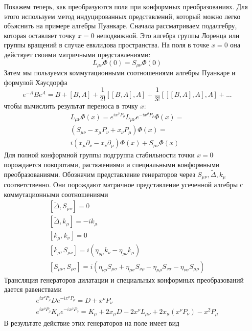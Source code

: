 \documentclass[a4paper,12pt]{article} \usepackage[utf8x]{inputenc} \usepackage[russian]{babel}
\theoremstyle{definition} \newtheorem{corollary}{Corollary}[theorem] \theoremstyle{definition}
\begin{document}
Покажем теперь, как преобразуются поля при конформных преобразованиях. Для этого используем метод
индуцированных представлений, который можно легко объяснить на примере алгебры Пуанкаре. Сначала
рассматриваем подалгебру, которая оставляет точку $x=0$ неподвижной. Это алгебра группы Лоренца или
группы вращений в случае евклидова пространства. На поля в точке $x=0$ она действует своими
матричными представлениями:
\begin{equation}
  \label{eq:176} L_{\mu\nu}\Phi(0)=S_{\mu\nu}\Phi(0)
\end{equation} Затем мы пользуемся коммутационными соотношениями алгебры Пуанкаре и формулой
Хаусдорфа
\begin{equation}
  \label{eq:177} e^{-A}B e^{A}=B+[B,A]+\frac{1}{2!}[[B,A],A]+\frac{1}{3!}[[[B,A],A],A]+\dots
\end{equation} чтобы вычислить результат переноса в точку $x$:
\begin{multline}
  \label{eq:178} L_{\mu\nu}\Phi(x)=e^{ix^{\rho}P_{\rho}}L_{\mu\nu}e^{-i x^{\rho}P_{\rho}}\Phi(x)=\\
(S_{\mu\nu}-x_{\mu}P_{\nu}+x_{\nu}P_{\mu})\Phi(x)=\\
i(x_{\mu}\partial_{\nu}-x_{\nu}\partial_{\mu})\Phi(x)+S_{\mu\nu}\Phi(x)
\end{multline} Для полной конформной группы подгруппа стабильности точки $x=0$ порождается
поворотами, растяжениями и специальными конформными преобразованиями. Обозначим представление
генераторов через $S_{\mu\nu}, \tilde \Delta, k_{\mu}$ соответственно. Они порождают матричное
представление усеченной алгебры с коммутационными соотношениями
\begin{eqnarray}
  \label{eq:179} \left[\tilde\Delta,S_{\mu\nu}\right]=0\\ \left[\tilde \Delta,k_{\mu}\right]=-i
k_{\mu}\\ \left[k_{\mu},k_{\nu}\right]=0\\
\left[k_{\rho},S_{\mu\nu}\right]=i(\eta_{\rho\mu}k_{\nu}-\eta_{\rho\nu}k_{\mu})\\
\left[S_{\mu\nu},S_{\rho\sigma}\right]=i(\eta_{\nu\rho}S_{\mu\sigma}+\eta_{\mu\sigma}S_{\nu\rho}-\eta_{\mu\rho}S_{\nu\sigma}-\eta_{\nu\sigma}S_{\mu\rho})
\end{eqnarray} Трансляция генераторов дилатации и специальных конформных преобразований дается
равенствами
\begin{eqnarray}
  \label{eq:180} e^{i x^{\rho}P_{\rho}}D e^{-i x^{\rho}P_{\rho}}=D+x^{\nu}P_{\nu}\\ e^{i
x^{\rho}P_{\rho}}K_{\mu} e^{-i x^{\rho}P_{\rho}}=K_{\mu}+2x_{\mu}D -2
x^{\nu}L_{\mu\nu}+2x_{\mu}(x^{\nu}P_{\nu})-x^{2} P_{\mu}
\end{eqnarray} В результате действие этих генераторов на поле имеет вид
\end{document}
